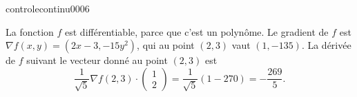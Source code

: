 \begin{corrige}{controlecontinu0006}


La fonction $f$ est différentiable, parce que c'est un polynôme. Le gradient de $f$ est $\nabla f(x,y)= (2x-3, -15y^2)$, qui au point $(2,3)$ vaut $(1,-135)$. La dérivée de $f$ suivant le vecteur donné au point $(2,3)$ est 
\begin{equation}
 \frac{1}{\sqrt{5}} \nabla f (2,3)\cdot \begin{pmatrix}
   1\\
   2
 \end{pmatrix}= \frac{1}{\sqrt{5}}(1-270)=- \frac{269}{5}.
\end{equation}

\end{corrige}
